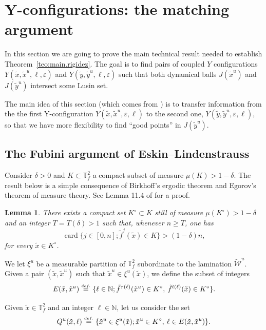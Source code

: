 \documentclass[a4paper,11pt,reqno]{amsart}
\newcommand{\N}{{\mathbb N}}
\newcommand{\TTf}{{\mathbb{T}_f^2}}
\newcommand{\cW}{{\mathcal W}}
\newcommand{\eps}{\varepsilon}
\newcommand{\card}{\operatorname{card}}
\newcommand{\eqdef}{\stackrel{\scriptscriptstyle\textrm def.}{=}}
\newcommand{\tix}{\tilde{x}}
\newcommand{\tif}{\tilde{f}}
\newcommand{\w}{\widetilde{\cW}}
\newtheorem{lemma}[theorem]{Lemma}
\theoremstyle{definition}
\begin{document}
\section{Y-configurations: the matching argument}
\label{sec:matching}

In this section we are going to prove the main technical result needed to establish Theorem~\ref{teo:main.rigidez}.  The goal is to find pairs of coupled $Y$ configurations $Y(\tix,\tix^u,\ell,\eps)$ and $Y(\tilde{y},\tilde{y}^u,\ell,\eps)$ such that both dynamical balls $J(\tix^u)$ and $J(\tilde{y}^u)$ intersect some Lusin set. 

The main idea of this section (which comes from \cite{EskinMirzakhani}) is to transfer information from the the first Y-configuration $Y(\tix,\tix^u,\eps,\ell)$ to the second one, $Y(\tilde{y},\tilde{y}^u,\eps,\ell)$, so that we have more flexibility to find ``good points'' in $J(\tilde{y}^u)$. 

\subsection{The Fubini argument of Eskin--Lindenstrauss}

Consider $\delta>0$ and $K\subset\TTf$ a compact subset of measure $\mu(K)>1-\delta$.  The result below is a simple consequence of Birkhoff's ergodic theorem and Egorov's theorem of measure theory. See Lemma 11.4 of \cite{ALOS} for a proof.

\begin{lemma}
	\label{lem:lema114}
There exists a compact set $K^\circ\subset K$ still of measure $\mu(K^\circ)>1-\delta$ and an integer $T=T(\delta)>1$ such that, whenever $n\geq T$, one has
\begin{equation}
	\label{eq:rec}
	\card\{j\in[0,n];\tif^j(\tix)\in K\}>(1-\delta)n,
\end{equation}
for every $\tix\in K^\circ$. 	
\end{lemma}
 
We let $\xi^u$ be a measurable partition of $\TTf$ subordinate to the lamination $\w^u$.  Given a pair $(\tix,\tix^u)$ such that $\tix^u\in\xi^u(\tix)$, we define the subset of integers
\[
E(\tix,\tix^u)\eqdef\{\ell\in\N;\tif^{\tau(\ell)}(\tix^u)\in K^\circ,\:\tif^{t(\ell)}(\tix)\in K^\circ\}.
\]

Given $\tix\in\TTf$ and an integer $\ell\in\N$, let us consider the set 
\begin{equation}
	\label{eq.q}
Q^u(\tix,\ell)\eqdef\{\tix^u\in\xi^u(\tix);\tix^u\in K^\circ,\:\ell\in E(\tix,\tix^u)\}.
\end{equation}  
\end{document}

